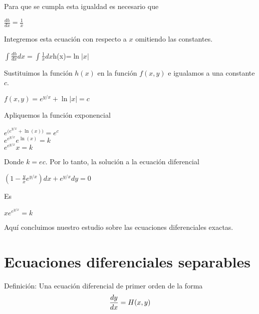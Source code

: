 \documentclass[l etterpaper,11pt]{article}
\begin{document}
Para que se cumpla esta igualdad es necesario que
\begin{center}

$\frac{dh}{dx}=\frac{1}{x}$\\
\end{center}

Integremos esta ecuación con respecto a $ x $ omitiendo las constantes.
\begin{center}

$\int\frac{dh}{dx}dx=\int\frac{1}{x}dx
$h(x)=$\ln{\left|x\right|}$\\
\end{center}

Sustituimos la función $h(x)$ en la función $ f(x,y) $ e igualamos a una constante $ c $.
\begin{center}

$f\left(x,y\right)=e^{y/x}+\ln{\left|x\right|}=c$\\
\end{center}

Apliquemos la función exponencial
\begin{center}

$e^{{(e}^{y/x}+\ln{(x)})}=e^c$\\
$e^{e^{y/x}}e^{\ln{(x)}}=k$\\
$e^{e^{y/x}}x=k$\\
\end{center}

Donde $ k=ec. $ Por lo tanto, la solución a la ecuación diferencial
\begin{center}

$(1-\frac{y}{x}e^{y/x})dx+e^{y/x}dy=0$\\
\end{center}

Es
\begin{center}

$xe^{e^{y/x}}=k$\\
\end{center}


Aquí concluimos nuestro estudio sobre las ecuaciones diferenciales exactas.


\section{Ecuaciones diferenciales separables}

Definición: Una ecuación diferencial de primer orden de la forma
\begin{equation}
\frac{dy}{dx}=H(x,y)\\
\end{equation}
\end{document}
